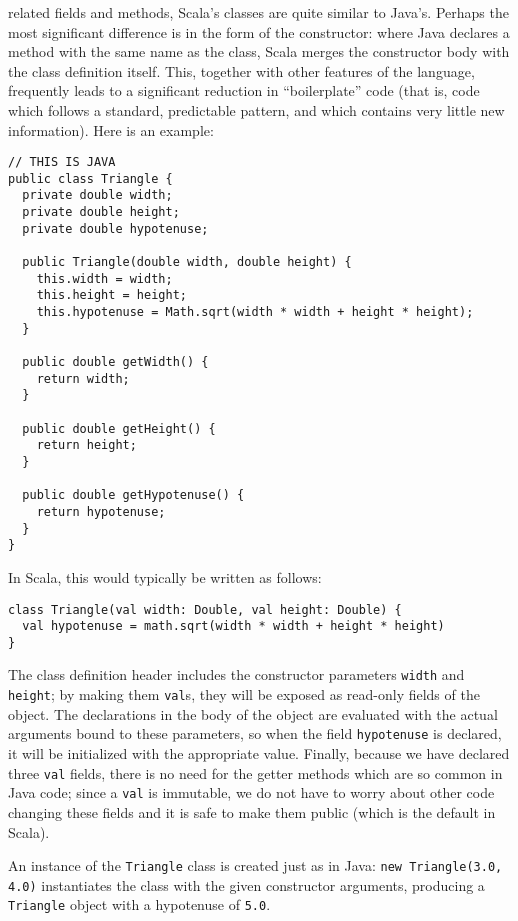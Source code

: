  related fields and methods, Scala's classes are quite similar to Java's. Perhaps the most significant difference is in the form of the constructor: where Java declares a method with the same name as the class, Scala merges the constructor body with the class definition itself. This, together with other features of the language, frequently leads to a significant reduction in ``boilerplate'' code (that is, code which follows a standard, predictable pattern, and which contains very little new information). Here is an example:
\begin{verbatim}
// THIS IS JAVA
public class Triangle {
  private double width;
  private double height;
  private double hypotenuse;

  public Triangle(double width, double height) {
    this.width = width;
    this.height = height;
    this.hypotenuse = Math.sqrt(width * width + height * height);
  }

  public double getWidth() {
    return width;
  }

  public double getHeight() {
    return height;
  }

  public double getHypotenuse() {
    return hypotenuse;
  }
}
\end{verbatim}
In Scala, this would typically be written as follows:
\begin{verbatim}
class Triangle(val width: Double, val height: Double) {
  val hypotenuse = math.sqrt(width * width + height * height)
}
\end{verbatim}
The class definition header includes the constructor parameters \texttt{width} and \texttt{height}; by making them \texttt{val}s, they will be exposed as read-only fields of the object. The declarations in the body of the object are evaluated with the actual arguments bound to these parameters, so when the field \texttt{hypotenuse} is declared, it will be initialized with the appropriate value. Finally, because we have declared three \texttt{val} fields, there is no need for the getter methods which are so common in Java code; since a \texttt{val} is immutable, we do not have to worry about other code changing these fields and it is safe to make them public (which is the default in Scala).

An instance of the \texttt{Triangle} class is created just as in Java: \texttt{new Triangle(3.0, 4.0)} instantiates the class with the given constructor arguments, producing a \texttt{Triangle} object with a hypotenuse of \texttt{5.0}.

